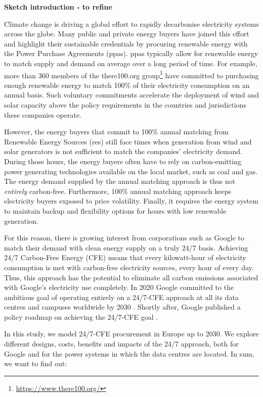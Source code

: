 \textbf{Sketch introduction - to refine}

Climate change is driving a global effort to rapidly decarbonise electricity systems across the globe. 
Many public and private energy buyers have joined this effort and highlight their sustainable credentials by procuring renewable energy with the Power Purchase Agreements (\gls{ppa}s).
\gls{ppa}s typically allow for renewable energy to match supply and demand on average over a long period of time. 
For example, more than 360 members of the there100.org group\footnote{\url{https://www.there100.org/}} have committed to purchasing enough renewable energy to match 100\% of their electricity consumption on an annual basis. 
Such voluntary commitments accelerate the deployment of wind and solar capacity above the policy requirements in the countries and jurisdictions these companies operate.

However, the energy buyers that commit to 100\% annual matching from Renewable Energy Sources (\gls{res}) still face times when generation from wind and solar generators is not sufficient to match the companies' electricity demand.
During those hours, the energy buyers often have to rely on carbon-emitting power generating technologies available on the local market, such as coal and gas. 
The energy demand supplied by the annual matching approach is thus not \textit{entirely} carbon-free. 
Furthermore, 100\% annual matching approach keeps electricity buyers exposed to price volatility. 
Finally, it requires the energy system to maintain backup and flexibility options for hours with low renewable generation.

For this reason, there is growing interest from corporations such as Google to match their demand with clean energy supply on a truly 24/7 basis. 
Achieving 24/7 Carbon-Free Energy (CFE) means that every kilowatt-hour of electricity consumption is met with carbon-free electricity sources, every hour of every day. 
Thus, this approach has the potential to eliminate all carbon emissions associated with Google's electricity use completely. 
In 2020 Google committed to the ambitious goal of operating entirely on a 24/7-CFE approach at all its data centres and campuses worldwide by 2030 \cite{Google-1}. 
Shortly after, Google published a policy roadmap on achieving the 24/7-CFE goal \cite{Google-2}.

In this study, we model 24/7-CFE procurement in Europe up to 2030. 
We explore different designs, costs, benefits and impacts of the 24/7 approach, both for Google and for the power systems in which the data centres are located. 
In sum, we want to find out: 

